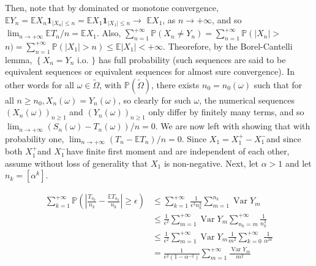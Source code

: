 \documentclass{amsbook}
\theoremstyle{plain}%
\theoremstyle{definition}
\theoremstyle{remark}
\begin{document}
    Then, note that by dominated or monotone convergence, $\mathbb{E} Y_{n}=\mathbb{E} X_{n} \mathbf{1}_{\left|X_{n}\right| \leq n}=\mathbb{E} X_{1} \mathbf{1}_{\left|X_{1}\right| \leq n} \rightarrow$ $\mathbb{E} X_{1}$, as $n \rightarrow+\infty$, and so $\lim _{n \rightarrow+\infty} \mathbb{E} T_{n} / n=\mathbb{E} X_{1}$. Also, $\sum_{n=1}^{+\infty} \mathbb{P}\left(X_{n} \neq Y_{n}\right)=\sum_{n=1}^{+\infty} \mathbb{P}\left(\left|X_{n}\right|>\right.$ $n)=\sum_{n=1}^{+\infty} \mathbb{P}\left(\left|X_{1}\right|>n\right) \leq \mathbb{E}\left|X_{1}\right|<+\infty$. Theorefore, by the Borel-Cantelli lemma, $\left\{X_{n}=Y_{n}\right.$ i.o. $\}$ has full probability (such sequences are said to be equivalent sequences or equivalent sequences for almost sure convergence). In other words for all $\omega \in \widetilde{\Omega}$, with $\mathbb{P}(\widetilde{\Omega})$, there exists $n_{0}=n_{0}(\omega)$ such that for all $n \geq n_{0}, X_{n}(\omega)=Y_{n}(\omega)$, so clearly for such $\omega$, the numerical sequences $\left(X_{n}(\omega)\right)_{n \geq 1}$ and $\left(Y_{n}(\omega)\right)_{n \geq 1}$ only differ by finitely many terms, and so $\lim _{n \rightarrow+\infty}\left(S_{n}(\omega)-T_{n}(\omega)\right) / n=0$. We are now left with showing that with probability one, $\lim _{n \rightarrow+\infty}\left(T_{n}-\mathbb{E} T_{n}\right) / n=0$. Since $X_{1}=X_{1}^{+}-X_{1}^{-}$and since both $X_{1}^{+}$and $X_{1}^{-}$have finite first moment and are independent of each other, assume without loss of generality that $X_{1}$ is non-negative. Next, let $\alpha>1$ and let $n_{k}=\left[\alpha^{k}\right]$.

    $$
    \begin{aligned}
      \sum_{k=1}^{+\infty} \mathbb{P}\left(\left|\frac{T_{n_{k}}}{n_{k}}-\frac{\mathbb{E} T_{n_{k}}}{n_{k}}\right| \geq \epsilon\right) & \leq \sum_{k=1}^{+\infty} \frac{1}{\epsilon^{2} n_{k}^{2}} \sum_{m=1}^{n_{k}} \operatorname{Var} Y_{m}                                \\
      & \leq \frac{1}{\epsilon^{2}} \sum_{m=1}^{+\infty} \operatorname{Var} Y_{m} \sum_{n_{k}=m}^{+\infty} \frac{1}{n_{k}^{2}}                \\
      & \leq \frac{1}{\epsilon^{2}} \sum_{m=1}^{+\infty} \operatorname{Var} Y_{m} \frac{1}{m^{2}} \sum_{k=0}^{+\infty} \frac{1}{\alpha^{2 k}} \\
      & =\frac{1}{\epsilon^{2}\left(1-\alpha^{-2}\right)} \sum_{m=1}^{+\infty} \frac{\operatorname{Var} Y_{m}}{m^{2}}
    \end{aligned}
    $$
\end{document}
